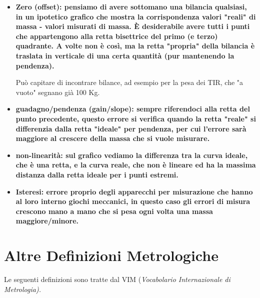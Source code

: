 \documentclass[a4paper,11pt]{report}
\begin{document}
\begin{itemize}
\begin{itemize}
  \end{itemize}
  \item \bf Zero (offset)\rm: pensiamo di avere sottomano una bilancia qualsiasi, in un ipotetico grafico che mostra la corrispondenza valori "reali" di massa - valori misurati di massa. È desiderabile avere tutti i punti che appartengono alla retta bisettrice del primo (e terzo) quadrante. A volte non è così, ma la retta "propria" della bilancia è traslata in verticale di una certa quantità (pur mantenendo la pendenza).
  
  Può capitare di incontrare bilance, ad esempio per la pesa dei TIR, che "a vuoto" segnano già 100 Kg.
  \item \bf guadagno/pendenza (gain/slope)\rm: sempre riferendoci alla retta del punto precedente, questo errore si verifica quando la retta "reale" si differenzia dalla retta "ideale" per pendenza, per cui l'errore sarà maggiore al crescere della massa che si vuole misurare.
  \item \bf non-linearità\rm: sul grafico vediamo la differenza tra la curva ideale, che è una retta, e la curva reale, che non è lineare ed ha la massima distanza dalla retta ideale per i punti estremi.
  \item \bf Isteresi\rm: errore proprio degli apparecchi per misurazione che hanno al loro interno giochi meccanici, in questo caso gli errori di misura crescono mano a mano che si pesa ogni volta una massa maggiore/minore.
\end{itemize}

\section{Altre Definizioni Metrologiche}
Le seguenti definizioni sono tratte dal VIM (\it Vocabolario Internazionale di Metrologia\rm).
\end{document}
